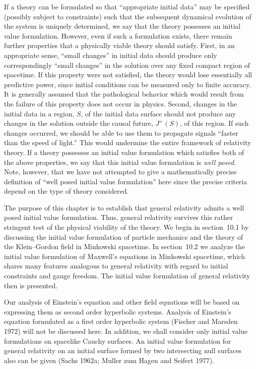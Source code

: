 If a theory can be formulated so that ``appropriate initial data'' may be specified
(possibly subject to constraints) such that the subsequent dynamical evolution of the
system is uniquely determined, we say that the theory possesses an initial value
formulation. %
However, even if such a formulation exists, there remain further properties that a
physically viable theory should satisfy. First, in an appropriate sense, ``small changes''
in initial data should produce only correspondingly ``small changes'' in the solution
over any fixed compact region of spacetime. If this property were not satisfied, the
theory would lose essentially all predictive power, since initial conditions can be
measured only to finite accuracy. It is generally assumed that the pathological behavior
which would result from the failure of this property does not occur in physics. Second,
changes in the initial data in a region, \(S\), of the initial data surface should not
produce any changes in the solution outside the causal future, \(J^+(S)\), of this region.
If such changes occurred, we should be able to use them to propagate signals ``faster
than the speed of light.'' This would undermine the entire framework of relativity theory.
If a theory possesses an initial value formulation which satisfies both of the above
properties, we say that this initial value formulation is \emph{well posed}. Note, however,
that we have not attempted to give a mathematically precise definition of ``well posed
initial value formulation'' here since the precise criteria depend on the type of theory
considered.

The purpose of this chapter is to establish that general relativity admits a well posed
initial value formulation. Thus, general relativity survives this rather stringent test of
the physical viability of the theory. We begin in section~10.1 by discussing the initial
value formulation of particle mechanics and the theory of the Klein--Gordon field in
Minkowski spacetime. In section~10.2 we analyze the initial value formulation of
Maxwell's equations in Minkowski spacetime, which shares many features analogous
to general relativity with regard to initial constraints and gauge freedom. The initial
value formulation of general relativity then is presented.

Our analysis of Einstein's equation and other field equations will be based on
expressing them as second order hyperbolic systems. Analysis of Einstein's equation
formulated as a first order hyperbolic system (Fischer and Marsden 1972) will not be
discussed here. In addition, we shall consider only initial value formulations on
spacelike Cauchy surfaces. An initial value formulation for general relativity on an
initial surface formed by two intersecting null surfaces also can be given (Sachs
1962a; Muller zum Hagen and Seifert 1977).
